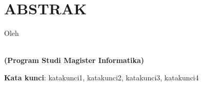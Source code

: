 \clearpage
\chapter*{ABSTRAK}

\begin{center}
	\begin{spacing}{1}
    \Large \bfseries \MakeUppercase \thetitle
    \end{spacing}
    
    \Large Oleh \\
    \begin{spacing}{1}
		\bfseries \Large \theauthor \\
		(Program Studi Magister Informatika)
    \end{spacing}
\end{center}

\begin{spacing}{1}
	\blindtext

	\blindtext
	
	\textbf{Kata kunci}: katakunci1, katakunci2, katakunci3, katakunci4
\end{spacing}
\clearpage